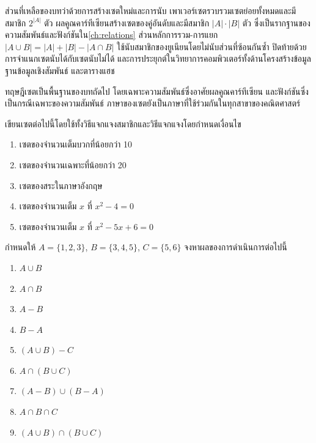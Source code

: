 ส่วนที่เหลือของบทว่าด้วยการสร้างเซตใหม่และการนับ เพาเวอร์เซตรวบรวมเซตย่อยทั้งหมดและมีสมาชิก $2^{|A|}$ ตัว ผลคูณคาร์ทีเซียนสร้างเซตของคู่อันดับและมีสมาชิก $|A| \cdot |B|$ ตัว ซึ่งเป็นรากฐานของความสัมพันธ์และฟังก์ชันใน\autoref{ch:relations} ส่วนหลักการรวม-การแยก $|A \cup B| = |A| + |B| - |A \cap B|$ ใช้นับสมาชิกของยูเนียนโดยไม่นับส่วนที่ซ้อนกันซ้ำ ปิดท้ายด้วยการจำแนกเซตนับได้กับเซตนับไม่ได้ และการประยุกต์ในวิทยาการคอมพิวเตอร์ทั้งด้านโครงสร้างข้อมูล ฐานข้อมูลเชิงสัมพันธ์ และตารางแฮช

ทฤษฎีเซตเป็นพื้นฐานของบทถัดไป โดยเฉพาะความสัมพันธ์ซึ่งอาศัยผลคูณคาร์ทีเซียน และฟังก์ชันซึ่งเป็นกรณีเฉพาะของความสัมพันธ์ ภาษาของเซตยังเป็นภาษาที่ใช้ร่วมกันในทุกสาขาของคณิตศาสตร์~\parencite{rosen2019discrete}

\clearpage
{}

\begin{exercise}
เขียนเซตต่อไปนี้โดยใช้ทั้งวิธีแจกแจงสมาชิกและวิธีแจกแจงโดยกำหนดเงื่อนไข
\begin{enumerate}
    \item เซตของจำนวนเต็มบวกที่น้อยกว่า 10
    \item เซตของจำนวนเฉพาะที่น้อยกว่า 20
    \item เซตของสระในภาษาอังกฤษ
    \item เซตของจำนวนเต็ม $x$ ที่ $x^2 - 4 = 0$
    \item เซตของจำนวนเต็ม $x$ ที่ $x^2 - 5x + 6 = 0$
\end{enumerate}
\end{exercise}

\begin{exercise}
กำหนดให้ $A = \{1, 2, 3\}$, $B = \{3, 4, 5\}$, $C = \{5, 6\}$ จงหาผลของการดำเนินการต่อไปนี้
\begin{enumerate}
    \item $A \cup B$
    \item $A \cap B$
    \item $A - B$
    \item $B - A$
    \item $(A \cup B) - C$
    \item $A \cap (B \cup C)$
    \item $(A - B) \cup (B - A)$
    \item $A \cap B \cap C$
    \item $(A \cup B) \cap (B \cup C)$
\end{enumerate}
\end{exercise}

